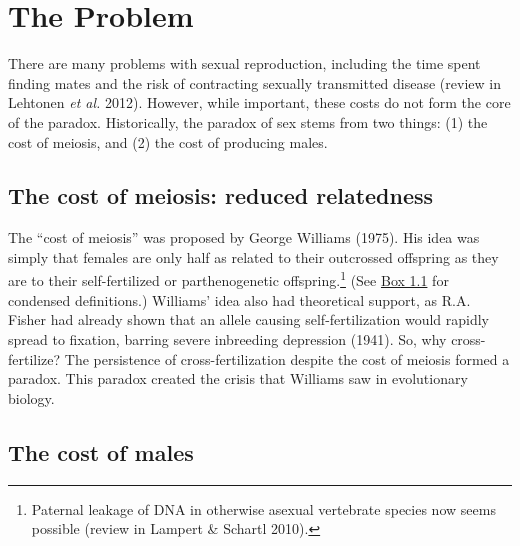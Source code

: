 \documentclass[
  letterpaper,
]{book}
\begin{document}
\section{The Problem}\label{the-problem}

There are many problems with sexual reproduction, including the time
spent finding mates and the risk of contracting sexually transmitted
disease (review in Lehtonen \emph{et al.} 2012). However, while
important, these costs do not form the core of the paradox.
Historically, the paradox of sex stems from two things: (1) the cost of
meiosis, and (2) the cost of producing males.

\subsection{The cost of meiosis: reduced
relatedness}\label{the-cost-of-meiosis-reduced-relatedness}

The ``cost of meiosis'' was proposed by George Williams (1975). His idea
was simply that females are only half as related to their outcrossed
offspring as they are to their self-fertilized or parthenogenetic
offspring.\footnote{Paternal leakage of DNA in otherwise asexual
  vertebrate species now seems possible (review in Lampert \& Schartl
  2010).} (See \hyperref[callout-1]{Box 1.1} for condensed definitions.)
Williams' idea also had theoretical support, as R.A. Fisher had already
shown that an allele causing self-fertilization would rapidly spread to
fixation, barring severe inbreeding depression (1941). So, why
cross-fertilize? The persistence of cross-fertilization despite the cost
of meiosis formed a paradox. This paradox created the crisis that
Williams saw in evolutionary biology.

\subsection{The cost of males}\label{the-cost-of-males}
\end{document}
